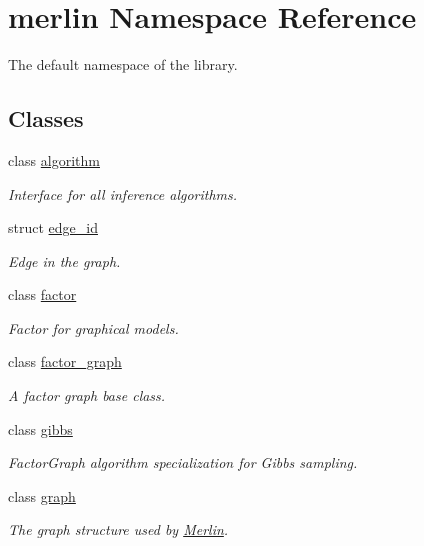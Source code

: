 \hypertarget{namespacemerlin}{}\section{merlin Namespace Reference}
\label{namespacemerlin}


The default namespace of the library.  


\subsection*{Classes}
\begin{DoxyCompactItemize}
\item 
class \hyperlink{classmerlin_1_1algorithm}{algorithm}
\begin{DoxyCompactList}\small\item\em Interface for all inference algorithms. \end{DoxyCompactList}\item 
struct \hyperlink{structmerlin_1_1edge__id}{edge\+\_\+id}
\begin{DoxyCompactList}\small\item\em Edge in the graph. \end{DoxyCompactList}\item 
class \hyperlink{classmerlin_1_1factor}{factor}
\begin{DoxyCompactList}\small\item\em Factor for graphical models. \end{DoxyCompactList}\item 
class \hyperlink{classmerlin_1_1factor__graph}{factor\+\_\+graph}
\begin{DoxyCompactList}\small\item\em A factor graph base class. \end{DoxyCompactList}\item 
class \hyperlink{classmerlin_1_1gibbs}{gibbs}
\begin{DoxyCompactList}\small\item\em Factor\+Graph algorithm specialization for Gibbs sampling. \end{DoxyCompactList}\item 
class \hyperlink{classmerlin_1_1graph}{graph}
\begin{DoxyCompactList}\small\item\em The graph structure used by \hyperlink{classMerlin}{Merlin}. \end{DoxyCompactList}\item 

\end{DoxyCompactItemize}

